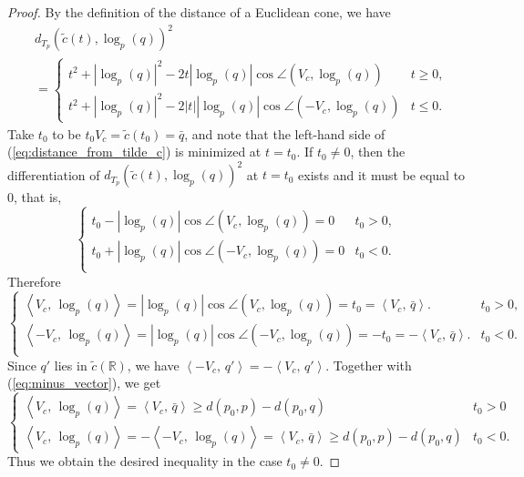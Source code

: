 \documentclass[12pt]{amsart}
\numberwithin{equation}{section}
\theoremstyle{plain}
\theoremstyle{definition}
\theoremstyle{remark}
\newcommand{\R}{{\mathbb R}}
\newcommand{\tcprj}{\log}
\newcommand{\inner}[2]{\left\langle #1,\, #2 \right\rangle}
\begin{document}
\begin{proof}
\vskip0.3cm
\noindent
 By the definition of the distance of a Euclidean cone, we have
 \begin{equation}
 \label{eq:distance_from_tilde_c}
\begin{split}
   & d_{T_p}(\tilde c(t), \tcprj_p(q))^2 
   \\ & =
   \begin{cases}
	t^2 + |\tcprj_p(q)|^2 -2t |\tcprj_p(q)| \cos \angle(V_c,\tcprj_p(q))
	& t \geq 0, \\
	t^2 + |\tcprj_p(q)|^2 -2|t| |\tcprj_p(q)| \cos \angle(-V_c,\tcprj_p(q))
	& t \leq 0. 
\end{cases}     
\end{split}
\end{equation}
 Take $t_0$ to be $t_0V_c=\tilde c(t_0)=\bar q$, and note that the
 left-hand side of (\ref{eq:distance_from_tilde_c}) is minimized at
 $t=t_0$. 
 If $t_0\not= 0$, then the differentiation of 
 $d_{T_p}(\tilde c(t), \tcprj_p(q))^2$ at $t=t_0$ exists and it 
 must be equal to $0$, that is, 
 \begin{equation*}
 \begin{cases}
  t_0 - |\tcprj_p(q)| \cos \angle(V_c,\tcprj_p(q)) = 0 & t_0 > 0, \\
  t_0 + |\tcprj_p(q)| \cos \angle(-V_c, \tcprj_p(q)) = 0 & t_0 < 0. \\
 \end{cases}\end{equation*}
Therefore 
 \begin{equation*}
  \begin{cases}
   \inner{V_c}{\tcprj_p(q)} =
   |\tcprj_p(q)|\cos \angle (V_c,\tcprj_p(q)) =t_0 = \inner{V_c}{\bar q}. 
    & t_0 >0, \\
   \inner{-V_c}{\tcprj_p(q)} =
   |\tcprj_p(q)|\cos \angle (-V_c,\tcprj_p(q)) =-t_0 = 
    -\inner{V_c}{\bar q}. & t_0 <0. \\
  \end{cases}     
 \end{equation*}
 Since $q'$ lies in $\tilde c(\R)$, we have 
 $\inner{-V_c}{q'} = -\inner{V_c}{q'}$. 
 Together with (\ref{eq:minus_vector}), we get 
 \begin{equation*}
  \begin{cases}
   \inner{V_c}{\tcprj_p(q)} = \inner{V_c}{\bar q}
    \geq d(p_0,p)-d(p_0,q) & t_0 >0 \\
   \inner{V_c}{\tcprj_p(q)} = -\inner{-V_c}{\tcprj_p(q)}
   = \inner{V_c}{\bar q}
    \geq d(p_0,p)-d(p_0,q)
   & t_0 <0. 
  \end{cases}
 \end{equation*}
 Thus we obtain the desired inequality in the case $t_0 \not= 0$. 


\end{proof}
\end{document}
